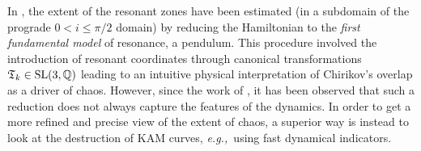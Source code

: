 \documentclass{amsart}
\theoremstyle{definition}
\theoremstyle{remark}
\numberwithin{equation}{section}
\newcommand{\eg}{\textit{e.g.,\ }}
\begin{document}
In \cite{jDa16}, the {\color{black}extent of the resonant zones have been estimated (in a subdomain of the prograde $0< i \le \pi/2$ domain) 
by reducing the Hamiltonian to the \textit{first fundamental model} of resonance, a pendulum. 
This procedure involved the introduction of  resonant coordinates through canonical transformations $\frak T_{k} \in \textrm{SL}(3,\mathbb{Q})$} {\color{black}leading to an intuitive physical interpretation of  Chirikov's overlap as a driver of chaos.} 
{\color{black}However}, since the work of \cite{aCe16-siam}, it has been observed that such a reduction {\color{black}does not always capture the features of the dynamics. In order to get a more refined and precise view of the extent of chaos, a superior way is instead to look at the destruction of KAM curves, \eg using fast dynamical indicators.} 


\end{document}
